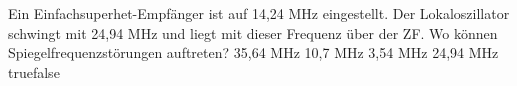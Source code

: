     {Ein Einfachsuperhet-Empfänger ist auf 14,24 MHz eingestellt. Der Lokaloszillator schwingt mit 24,94 MHz und liegt mit dieser Frequenz über der ZF. Wo können Spiegelfrequenzstörungen auftreten?}
    {35,64 MHz}
    {10,7 MHz}
    {3,54 MHz}
    {24,94 MHz}
    {true}{false}